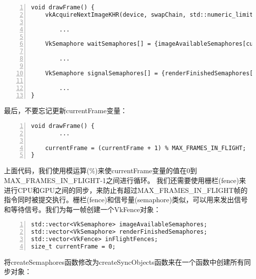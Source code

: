 \documentclass{ctexart}
\begin{document}
\begin{lstlisting}[language={[ANSI]C},keywordstyle=\color{blue!70},commentstyle=\color{red!50!green!50!blue!50},frame=shadowbox, rulesepcolor=\color{red!20!green!20!blue!20},basicstyle=\small,numbers=left, numberstyle=\tiny,breaklines=true]
void drawFrame() {
	vkAcquireNextImageKHR(device, swapChain, std::numeric_limits<uint64_t>::max(), imageAvailableSemaphores[currentFrame], VK_NULL_HANDLE, &imageIndex);

		...

	VkSemaphore waitSemaphores[] = {imageAvailableSemaphores[currentFrame]};

		...

	VkSemaphore signalSemaphores[] = {renderFinishedSemaphores[currentFrame]};

		...
}
\end{lstlisting}

最后，不要忘记更新currentFrame变量：

\begin{lstlisting}[language={[ANSI]C},keywordstyle=\color{blue!70},commentstyle=\color{red!50!green!50!blue!50},frame=shadowbox, rulesepcolor=\color{red!20!green!20!blue!20},basicstyle=\small,numbers=left, numberstyle=\tiny,breaklines=true]
void drawFrame() {
		...

	currentFrame = (currentFrame + 1) % MAX_FRAMES_IN_FLIGHT;
}
\end{lstlisting}

上面代码，我们使用模运算(\%)来使currentFrame变量的值在0到MAX\_FRAMES\_IN\_FLIGHT-1之间进行循环。
我们还需要使用栅栏(fence)来进行CPU和GPU之间的同步，来防止有超过MAX\_FRAMES\_IN\_FLIGHT帧的指令同时被提交执行。栅栏(fence)和信号量(semaphore)类似，可以用来发出信号和等待信号。我们为每一帧创建一个VkFence对象：

\begin{lstlisting}[language={[ANSI]C},keywordstyle=\color{blue!70},commentstyle=\color{red!50!green!50!blue!50},frame=shadowbox, rulesepcolor=\color{red!20!green!20!blue!20},basicstyle=\small,numbers=left, numberstyle=\tiny,breaklines=true]
std::vector<VkSemaphore> imageAvailableSemaphores;
std::vector<VkSemaphore> renderFinishedSemaphores;
std::vector<VkFence> inFlightFences;
size_t currentFrame = 0;
\end{lstlisting}

将createSemaphores函数修改为createSyncObjects函数来在一个函数中创建所有同步对象：
\end{document}

